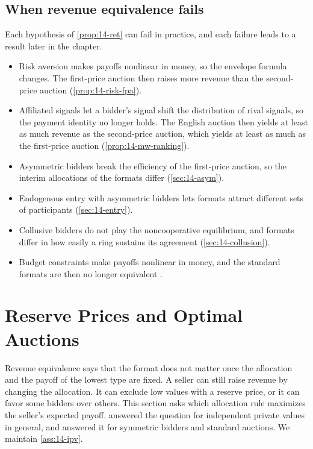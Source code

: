 \subsection{When revenue equivalence fails}\label{sec:14-ret-failures}

Each hypothesis of \cref{prop:14-ret} can fail in practice, and each failure leads to a result later in the chapter.
\begin{itemize}
\item Risk aversion makes payoffs nonlinear in money, so the envelope formula changes. The first-price auction then raises more revenue than the second-price auction (\cref{prop:14-risk-fpa}).
\item Affiliated signals let a bidder's signal shift the distribution of rival signals, so the payment identity no longer holds. The English auction then yields at least as much revenue as the second-price auction, which yields at least as much as the first-price auction (\cref{prop:14-mw-ranking}).
\item Asymmetric bidders break the efficiency of the first-price auction, so the interim allocations of the formats differ (\cref{sec:14-asym}).
\item Endogenous entry with asymmetric bidders lets formats attract different sets of participants (\cref{sec:14-entry}).
\item Collusive bidders do not play the noncooperative equilibrium, and formats differ in how easily a ring sustains its agreement (\cref{sec:14-collusion}).
\item Budget constraints make payoffs nonlinear in money, and the standard formats are then no longer equivalent \citep{CheGale1998}.
\end{itemize}

\section{Reserve Prices and Optimal Auctions}\label{sec:14-optimal}

Revenue equivalence says that the format does not matter once the allocation and the payoff of the lowest type are fixed. A seller can still raise revenue by changing the allocation. It can exclude low values with a reserve price, or it can favor some bidders over others. This section asks which allocation rule maximizes the seller's expected payoff.  answered the question for independent private values in general, and \citet{RileySamuelson1981} answered it for symmetric bidders and standard auctions. We maintain \cref{ass:14-ipv}.

